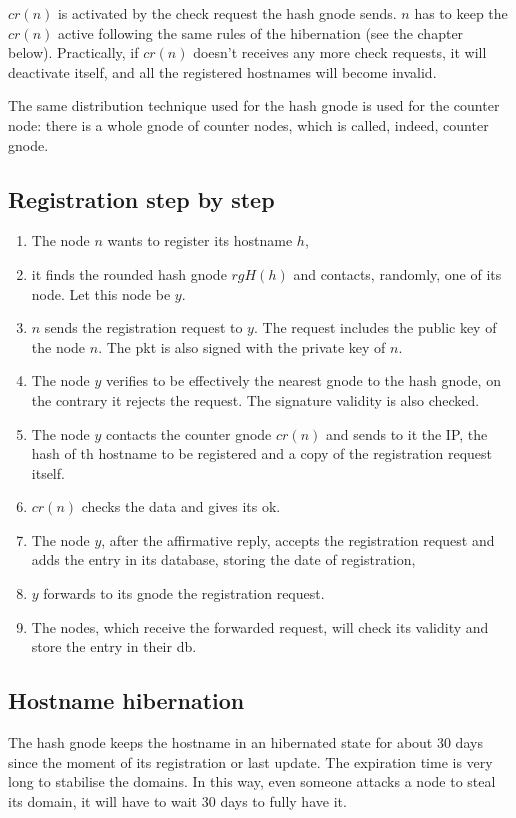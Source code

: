 \documentclass[a4paper]{article}
\begin{document}
$cr(n)$ is activated by the check request the hash gnode sends. $n$ has to
keep the $cr(n)$ active following the same rules of the hibernation (see the
chapter below). Practically, if $cr(n)$ doesn't receives any more check
requests, it will deactivate itself, and all the registered hostnames will
become invalid.

The same distribution technique used for the hash gnode is used for the counter
node: there is a whole gnode of counter nodes, which is called, indeed,
counter gnode.

\subsection{Registration step by step} 
\begin{enumerate}
	\item The node $n$ wants to register its hostname $h$,
	\item it finds the rounded hash gnode $rgH(h)$ and contacts, randomly,
		one of its node. Let this node be $y$.
	\item $n$ sends the registration request to $y$. The request includes
		the public key of the node $n$. The pkt is also signed with
		the private key of $n$.
	\item The node $y$ verifies to be effectively the nearest gnode to the
		hash gnode, on the contrary it rejects the request.
		The signature validity is also checked.
	\item The node $y$ contacts the counter gnode $cr(n)$ and sends to it
		the IP, the hash of th hostname to be registered and a copy of
		the registration request itself.
	\item $cr(n)$ checks the data and gives its ok.
	\item The node $y$, after the affirmative reply, accepts the
		registration request and adds the entry in its database,
		storing the date of registration,
	\item $y$ forwards to its gnode the registration request.
	\item The nodes, which receive the forwarded request, will check its
		validity and store the entry in their db.
\end{enumerate}
  
\subsection{Hostname hibernation}

The hash gnode keeps the hostname in an hibernated state for about 30 days
since the moment of its registration or last update.
The expiration time is very long to stabilise the domains. In this way, even
someone attacks a node to steal its domain, it will have to wait 30 days
to fully have it.
\end{document}
